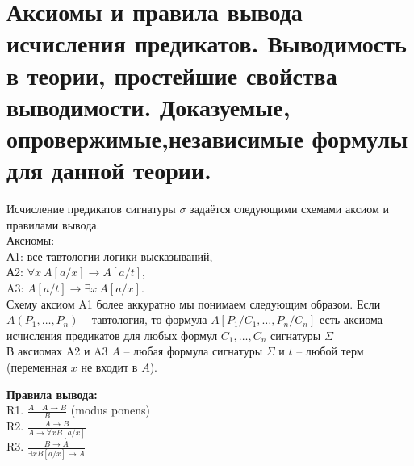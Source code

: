 \section{Аксиомы и правила вывода исчисления предикатов. Выводимость в теории, простейшие свойства выводимости. Доказуемые, опровержимые,независимые формулы для данной теории.}
Исчисление предикатов сигнатуры $\sigma$ задаётся следующими схемами аксиом и правилами вывода.\\
Аксиомы:\\
А1: все тавтологии логики высказываний,\\
А2: $\forall x \ A[a/x] \rightarrow A[a/t]$,\\
A3: $A[a/t] \rightarrow \exists x \ A[a/x]$. \\
Схему аксиом A1 более аккуратно мы понимаем следующим образом. Если $A(P_1,\ldots,P_n)$ -- тавтология, то формула $A[P_1/C_1,\ldots,P_n/C_n]$ есть аксиома исчисления предикатов для любых формул $C_1,\ldots,C_n$ сигнатуры $\Sigma$\\
В аксиомах A2 и A3 $A$ -- любая формула сигнатуры $\Sigma$ и $t$ -- любой терм (переменная $x$ не входит в $A$).

\textbf{Правила вывода:}\\
    R1. $\frac{A \quad A \rightarrow B}{B}$ (modus ponens)\\ \medskip 
    R2. $\frac{A \rightarrow B}{A \rightarrow \forall x B[a / x]}$\\ \medskip 
    R3. $\frac{B \rightarrow A}{\exists x B[a / x] \rightarrow A}$
    
